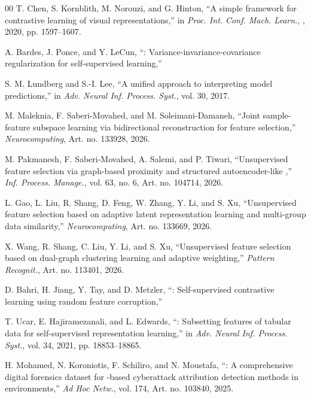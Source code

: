 \begin{thebibliography}{00}
T. Chen, S. Kornblith, M. Norouzi, and G. Hinton, ``A simple framework for contrastive learning of visual representations,'' in \emph{Proc. Int. Conf. Mach. Learn.}, , 2020, pp. 1597--1607.

A. Bardes, J. Ponce, and Y. LeCun, ``: Variance-invariance-covariance regularization for self-supervised learning,'' 

S. M. Lundberg and S.-I. Lee, ``A unified approach to interpreting model predictions,'' in \emph{Adv. Neural Inf. Process. Syst.}, vol. 30, 2017.

M. Maleknia, F. Saberi-Movahed, and M. Soleimani-Damaneh, ``Joint sample-feature subspace learning via bidirectional reconstruction for feature selection,'' \emph{Neurocomputing}, Art. no. 133928, 2026.

M. Pakmanesh, F. Saberi-Movahed, A. Salemi, and P. Tiwari, ``Unsupervised feature selection via graph-based proximity and structured autoencoder-like ,'' \emph{Inf. Process. Manage.}, vol. 63, no. 6, Art. no. 104714, 2026.

L. Gao, L. Liu, R. Shang, D. Feng, W. Zhang, Y. Li, and S. Xu, ``Unsupervised feature selection based on adaptive latent representation learning and multi-group data similarity,'' \emph{Neurocomputing}, Art. no. 133669, 2026.

X. Wang, R. Shang, C. Liu, Y. Li, and S. Xu, ``Unsupervised feature selection based on dual-graph clustering learning and adaptive weighting,'' \emph{Pattern Recognit.}, Art. no. 113401, 2026.

D. Bahri, H. Jiang, Y. Tay, and D. Metzler, ``: Self-supervised contrastive learning using random feature corruption,'' 

T. Ucar, E. Hajiramezanali, and L. Edwards, ``: Subsetting features of tabular data for self-supervised representation learning,'' in \emph{Adv. Neural Inf. Process. Syst.}, vol. 34, 2021, pp. 18853--18865.

H. Mohamed, N. Koroniotis, F. Schiliro, and N. Moustafa, ``: A comprehensive digital forensics dataset for -based cyberattack attribution detection methods in  environments,'' \emph{Ad Hoc Netw.}, vol. 174, Art. no. 103840, 2025.


\end{thebibliography}
